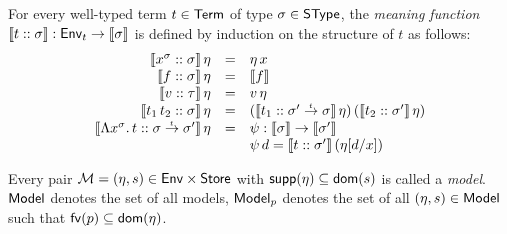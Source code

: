 \documentclass[12pt,a4paper]{report}
\newcommand{\senv}{\nstyle{env}}
\begin{document}

\begin{definition}
  For every well-typed term $t \in \mathsf{Term}$ of type $\sigma \in \mathsf{SType}$, the {\em meaning function}
  $\llbracket{t}\mathrel{::}{\sigma}\rrbracket: \mathsf{Env}_t \to \llbracket\sigma\rrbracket$ is defined by induction on the structure of $t$ as
  follows:
  \[\begin{array}{rcl}
    \llbracket{x^\sigma}\mathrel{::}{\sigma}\rrbracket\,\eta
      &=& \eta\,x \\
    \llbracket{f}\mathrel{::}{\sigma}\rrbracket\,\eta 
      &=& \llbracket f\rrbracket \\
    \llbracket{v}\mathrel{::}{\tau}\rrbracket\,\eta
      &=& v\,\eta \\
    \llbracket{t_1\,t_2}\mathrel{::}{\sigma}\rrbracket\,\eta
      &=& (\llbracket{t_1}\mathrel{::}{\sigma'\stackrel{_t}{\to}\sigma}\rrbracket\,\eta)\,
          (\llbracket{t_2}\mathrel{::}{\sigma'}\rrbracket\,\eta) \\
    \llbracket{\Lambda x^\sigma.\,t}\mathrel{::}{\sigma\stackrel{_t}{\to}\sigma'}\rrbracket\,\eta
      &=& \psi: \llbracket\sigma\rrbracket \to \llbracket\sigma'\rrbracket \\
      & & \psi\, d = \llbracket{t}\mathrel{::}{\sigma'}\rrbracket\,(\eta[d/x])
  \end{array}\]
\end{definition}

\begin{definition}[Model]
  Every pair $\mathcal{M} = (\eta,s) \in \mathsf{Env} \times \mathsf{Store}$ with $\mathsf{supp}(\eta) \subseteq \mathsf{dom}(s)$
  is called a {\em model}. $\mathsf{Model}$ denotes
  the set of all models, $\mathsf{Model}_p$ denotes the set of all $(\eta,s) \in \mathsf{Model}$ such that
  $\mathsf{fv}(p) \subseteq \mathsf{dom}(\eta)$.
\end{definition}
\end{document}
